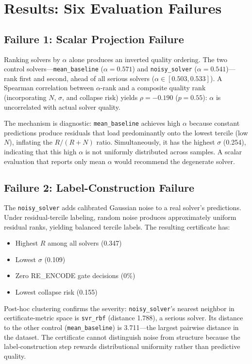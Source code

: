 \documentclass{article}
\begin{document}
\section{Results: Six Evaluation Failures}
\label{sec:results}

\subsection{Failure 1: Scalar Projection Failure}

Ranking solvers by $\alpha$ alone produces an inverted quality ordering. The two control solvers---\texttt{mean\_baseline} ($\alpha = 0.571$) and \texttt{noisy\_solver} ($\alpha = 0.541$)---rank first and second, ahead of all serious solvers ($\alpha \in [0.503, 0.533]$). A Spearman correlation between $\alpha$-rank and a composite quality rank (incorporating $N$, $\sigma$, and collapse risk) yields $\rho = -0.190$ ($p = 0.55$): $\alpha$ is uncorrelated with actual solver quality.

The mechanism is diagnostic: \texttt{mean\_baseline} achieves high $\alpha$ because constant predictions produce residuals that load predominantly onto the lowest tercile (low $N$), inflating the $R/(R+N)$ ratio. Simultaneously, it has the highest $\sigma$ (0.254), indicating that this high $\alpha$ is not uniformly distributed across samples. A scalar evaluation that reports only mean $\alpha$ would recommend the degenerate solver.

\subsection{Failure 2: Label-Construction Failure}

The \texttt{noisy\_solver} adds calibrated Gaussian noise to a real solver's predictions. Under residual-tercile labeling, random noise produces approximately uniform residual ranks, yielding balanced tercile labels. The resulting certificate has:
\begin{itemize}
    \item Highest $R$ among all solvers (0.347)
    \item Lowest $\sigma$ (0.109)
    \item Zero RE\_ENCODE gate decisions (0\%)
    \item Lowest collapse risk (0.155)
\end{itemize}

Post-hoc clustering confirms the severity: \texttt{noisy\_solver}'s nearest neighbor in certificate-metric space is \texttt{svr\_rbf} (distance 1.788), a serious solver. Its distance to the other control (\texttt{mean\_baseline}) is 3.711---the largest pairwise distance in the dataset. The certificate cannot distinguish noise from structure because the label-construction step rewards distributional uniformity rather than predictive quality.
\end{document}
